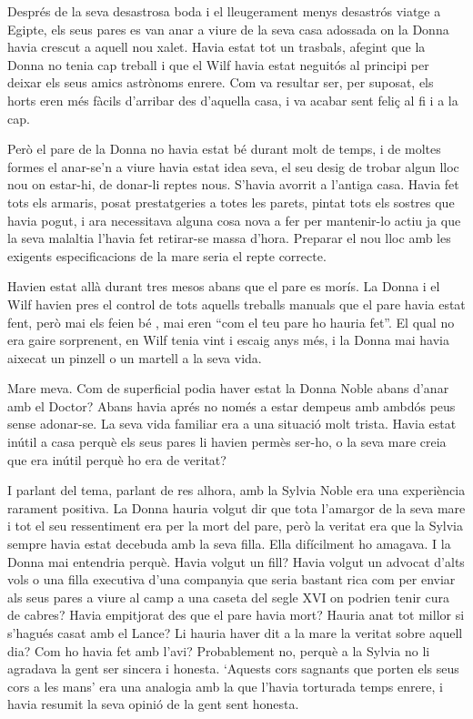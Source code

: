 Després de la seva desastrosa boda i el lleugerament menys desastrós
viatge a Egipte, els seus pares es van anar a viure de la seva casa
adossada on la Donna havia crescut a aquell nou xalet. Havia estat tot
un trasbals, afegint que la Donna no tenia cap treball i que el Wilf
havia estat neguitós al principi per deixar els seus amics astrònoms
enrere. Com va resultar ser, per suposat, els horts eren més fàcils
d'arribar des d'aquella casa, i va acabar sent feliç al fi i a la cap.

Però el pare de la Donna no havia estat bé durant molt de temps, i de
moltes formes el anar-se'n a viure havia estat idea seva, el seu desig
de trobar algun lloc nou on estar-hi, de donar-li reptes nous. S'havia
avorrit a l'antiga casa. Havia fet tots els armaris, posat prestatgeries
a totes les parets, pintat tots els sostres que havia pogut, i ara
necessitava alguna cosa nova a fer per mantenir-lo actiu ja que la seva
malaltia l'havia fet retirar-se massa d'hora. Preparar el nou lloc amb
les exigents especificacions de la mare seria el repte correcte.

Havien estat allà durant tres mesos abans que el pare es morís. La Donna
i el Wilf havien pres el control de tots aquells treballs manuals que el
pare havia estat fent, però mai els feien bé , mai eren ``com el teu
pare ho hauria fet''. El qual no era gaire sorprenent, en Wilf tenia
vint i escaig anys més, i la Donna mai havia aixecat un pinzell o un
martell a la seva vida.

Mare meva. Com de superficial podia haver estat la Donna Noble abans
d'anar amb el Doctor? Abans havia aprés no només a estar dempeus amb
ambdós peus sense adonar-se. La seva vida familiar era a una situació
molt trista. Havia estat inútil a casa perquè els seus pares li havien
permès ser-ho, o la seva mare creia que era inútil perquè ho era de
veritat?

I parlant del tema, parlant de res alhora, amb la Sylvia Noble era una
experiència rarament positiva. La Donna hauria volgut dir que tota
l'amargor de la seva mare i tot el seu ressentiment era per la mort del
pare, però la veritat era que la Sylvia sempre havia estat decebuda amb
la seva filla. Ella difícilment ho amagava. I la Donna mai entendria
perquè. Havia volgut un fill? Havia volgut un advocat d'alts vols o una
filla executiva d'una companyia que seria bastant rica com per enviar
als seus pares a viure al camp a una caseta del segle XVI on podrien
tenir cura de cabres? Havia empitjorat des que el pare havia mort?
Hauria anat tot millor si s'hagués casat amb el Lance? Li hauria haver
dit a la mare la veritat sobre aquell dia? Com ho havia fet amb l'avi?
Probablement no, perquè a la Sylvia no li agradava la gent ser sincera i
honesta. `Aquests cors sagnants que porten els seus cors a les mans' era
una analogia amb la que l'havia torturada temps enrere, i havia resumit
la seva opinió de la gent sent honesta.

